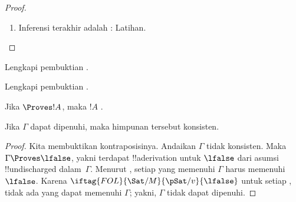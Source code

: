\documentclass[../../../include/open-logic-section]{subfiles}
\begin{document}
\begin{proof}
\begin{enumerate}
\item Inferensi terakhir adalah \Elim{\lnot}: Latihan.

\end{enumerate}
\end{proof}

\begin{prob}
Lengkapi pembuktian .
\end{prob}
\tagendprob

\begin{prob}
Lengkapi pembuktian .
\end{prob}
\tagendprob

\begin{cor}
Jika $\Proves !A$, maka $!A$ .
\end{cor}

\begin{cor}
Jika $\Gamma$ dapat dipenuhi, maka himpunan tersebut konsisten.
\end{cor}

\begin{proof}
Kita membuktikan kontraposisinya. Andaikan $\Gamma$ tidak konsisten.
Maka $\Gamma \Proves \lfalse$, yakni terdapat !!a{derivation} untuk
$\lfalse$ dari asumsi !!{undischarged} dalam~$\Gamma$. Menurut
, setiap
yang memenuhi $\Gamma$ harus memenuhi $\lfalse$. Karena
$\iftag{FOL}{\Sat/{M}}{\pSat/{v}}{\lfalse}$ untuk setiap
,
tidak ada  yang dapat memenuhi
$\Gamma$; yakni, $\Gamma$ tidak dapat dipenuhi.
\end{proof}
\end{document}
